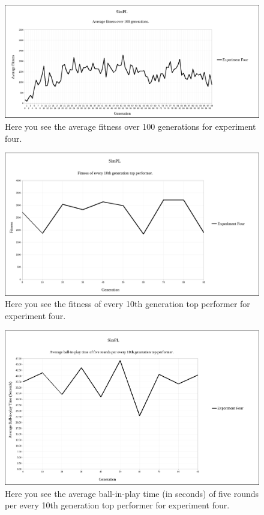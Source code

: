 \documentclass[a4paper,10pt]{article}
\begin{document}
\begin{figure}[H]  
  \centering
  \includegraphics[width=1\textwidth]{figures/exp4_avg_fit.png}
  \caption{Here you see the average fitness over 100 generations for experiment four.}
  \label{fig:exp4_avg_fit}
\end{figure}

\begin{figure}[H]  
  \centering
  \includegraphics[width=1\textwidth]{figures/exp4_10_tops.png}
  \caption{Here you see the fitness of every 10th generation top performer for experiment four.}
  \label{fig:exp4_10_tops}
\end{figure}

\begin{figure}[H]  
  \centering
  \includegraphics[width=1\textwidth]{figures/exp4_10_tops_times.png}
  \caption{Here you see the average ball-in-play time (in seconds) of five rounds per every 10th generation top performer for experiment four.}
  \label{fig:exp4_10_tops_times}
\end{figure}
\end{document}

